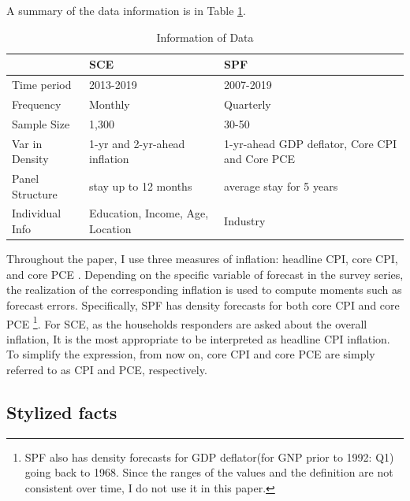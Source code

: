 \documentclass[12pt]{article}
\begin{document}
	A summary of the data information is in Table \ref{DataInfo}. 

	\begin{table}[ht]
		\caption{Information of Data}
		\label{DataInfo}
		\begin{tabularx}{\textwidth}{|X|X|X|}
			\hline 
			& SCE & SPF        \\
			\hline 
			Time period                                    & 2013-2019                           &
			 2007-2019             \\
			 \hline 
			Frequency                                      & Monthly                                 & Quarterly                \\
			\hline 
			Sample Size                                    & 1,300                                   & 30-50                    \\
			\hline 
			Var in Density                       & 1-yr and 2-yr-ahead inflation          & 1-yr-ahead GDP deflator, Core CPI and Core PCE         \\
			\hline 
			Panel Structure                               & stay up to 12 months                    & average stay for 5 years \\
			\hline 
			Individual Info                        & Education, Income, Age, Location        & Industry    \\
			\hline 
		\end{tabularx}
	\end{table}
	
	Throughout the paper, I use three measures of inflation: headline CPI, core CPI, and core PCE . Depending on the specific variable of forecast in the survey series, the realization of the corresponding inflation is used to compute moments such as forecast errors. Specifically, SPF has density forecasts for both core CPI and core PCE \footnote{SPF also has density forecasts for GDP deflator(for GNP prior to 1992: Q1) going back to 1968. Since the ranges of the values and the definition are not consistent over time, I do not use it in this paper.}. For SCE, as the households responders are asked about the overall inflation, It is the most appropriate to be interpreted as headline CPI inflation. To simplify the expression, from now on, core CPI and core PCE are simply referred to as CPI and PCE, respectively. 

	\subsection{Stylized facts}\label{StylizedFacts}
	
\end{document}
